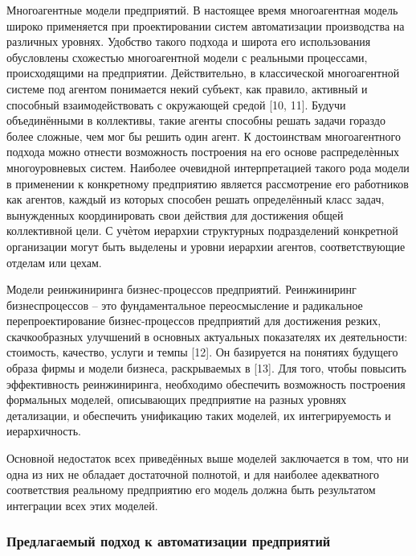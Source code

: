\begin{textitemize}
    \item Многоагентные модели предприятий. В настоящее время многоагентная модель широко применяется при проектировании систем автоматизации производства на различных уровнях. Удобство такого подхода и широта его использования обусловлены схожестью многоагентной модели с реальными процессами, происходящими на предприятии. Действительно, в классической многоагентной системе под агентом понимается некий субъект, как правило, активный и способный взаимодействовать с окружающей средой [10, 11]. Будучи объединёнными в коллективы, такие агенты способны решать задачи гораздо более сложные, чем мог бы решить один агент. К достоинствам многоагентного подхода можно отнести возможность построения на его основе распределѐнных многоуровневых систем. Наиболее очевидной интерпретацией такого рода модели в применении к конкретному предприятию является рассмотрение его работников как агентов, каждый из которых способен решать определённый класс задач, вынужденных координировать свои действия для достижения общей коллективной цели. С учѐтом иерархии структурных подразделений конкретной организации могут быть выделены и уровни иерархии агентов, соответствующие отделам или цехам.
    \item Модели реинжиниринга бизнес-процессов предприятий. Реинжиниринг бизнеспроцессов – это фундаментальное переосмысление и радикальное перепроектирование бизнес-процессов предприятий для достижения резких, скачкообразных улучшений в основных актуальных показателях их деятельности: стоимость, качество, услуги и темпы [12]. Он базируется на понятиях будущего образа фирмы и модели бизнеса, раскрываемых в [13]. Для того, чтобы повысить эффективность реинжиниринга, необходимо обеспечить возможность построения формальных моделей, описывающих предприятие на разных уровнях детализации, и обеспечить унификацию таких моделей, их интегрируемость и иерархичность.
\end{textitemize}

Основной недостаток всех приведённых выше моделей заключается в том, что ни одна из них не обладает достаточной полнотой, и для наиболее адекватного соответствия реальному предприятию его модель должна быть результатом интеграции всех этих моделей.

\subsubsection{Предлагаемый подход к автоматизации предприятий}


